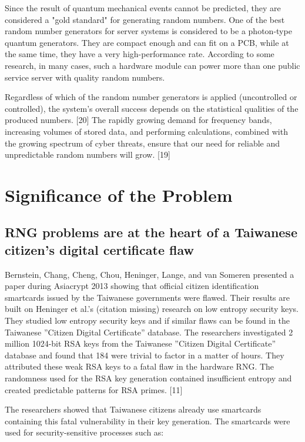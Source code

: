 \documentclass[runningheads]{llncs}
\begin{document}
Since the result of quantum mechanical events cannot be predicted, they are considered a "gold standard" for generating random numbers. One of the best random number generators for server systems is considered to be a photon-type quantum generators. They are compact enough and can fit on a PCB, while at the same time, they have a very high-performance rate. According to some research, in many cases, such a hardware module can power more than one public service server with quality random numbers. 

Regardless of which of the random number generators is applied (uncontrolled or controlled), the system's overall success depends on the statistical qualities of the produced numbers. [20] The rapidly growing demand for frequency bands, increasing volumes of stored data, and performing calculations, combined with the growing spectrum of cyber threats, ensure that our need for reliable and unpredictable random numbers will grow. [19] 

\section{Significance of the Problem}
\label{sec:2}

\subsection{RNG problems are at the heart of a Taiwanese citizen's digital certificate flaw}
\label{sub-sec:2-1}

Bernstein, Chang, Cheng, Chou, Heninger, Lange, and van Someren presented a paper during Asiacrypt 2013 showing that official citizen identification smartcards issued by the Taiwanese governments were flawed. Their results are built on Heninger et al.'s (citation missing) research on low entropy security keys. They studied low entropy security keys and if similar flaws can be found in the Taiwanese ”Citizen Digital Certificate” database. The researchers investigated 2 million 1024-bit RSA keys from the Taiwanese ”Citizen Digital Certificate” database and found that 184 were trivial to factor in a matter of hours. They attributed these weak RSA keys to a fatal flaw in the hardware RNG. The randomness used for the RSA key generation contained insufficient entropy and created predictable patterns for RSA primes. [11]

The researchers showed that Taiwanese citizens already use smartcards containing this fatal vulnerability in their key generation. The smartcards were used for security-sensitive processes such as:
\end{document}
